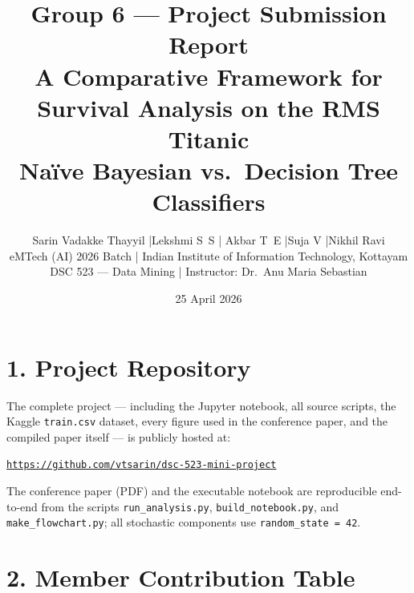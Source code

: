 \documentclass[11pt,a4paper]{article}
\title{\vspace{-1.5em}\textbf{Group 6 --- Project Submission Report}\\[4pt]
\large A Comparative Framework for Survival Analysis on the RMS Titanic\\
\normalsize Na\"ive Bayesian vs.\ Decision Tree Classifiers}
\author{%
  Sarin Vadakke Thayyil \quad|\quad Lekshmi S~S \quad|\quad
  Akbar T~E \quad|\quad Suja V \quad|\quad Nikhil Ravi \\[2pt]
  \small eMTech (AI) 2026 Batch \quad|\quad
  Indian Institute of Information Technology, Kottayam \\
  \small DSC 523 --- Data Mining \quad|\quad
  Instructor: Dr.\ Anu Maria Sebastian
}
\date{25 April 2026}
\begin{document}
\maketitle

\section*{1. Project Repository}
The complete project --- including the Jupyter notebook, all source scripts, the
Kaggle \texttt{train.csv} dataset, every figure used in the conference paper, and
the compiled paper itself --- is publicly hosted at:

\begin{center}
\href{https://github.com/vtsarin/dsc-523-mini-project}{%
\texttt{https://github.com/vtsarin/dsc-523-mini-project}}
\end{center}

\noindent The conference paper (PDF) and the executable notebook are reproducible
end-to-end from the scripts \texttt{run\_analysis.py},
\texttt{build\_notebook.py}, and \texttt{make\_flowchart.py}; all stochastic
components use \texttt{random\_state = 42}.

\section*{2. Member Contribution Table}
\end{document}
